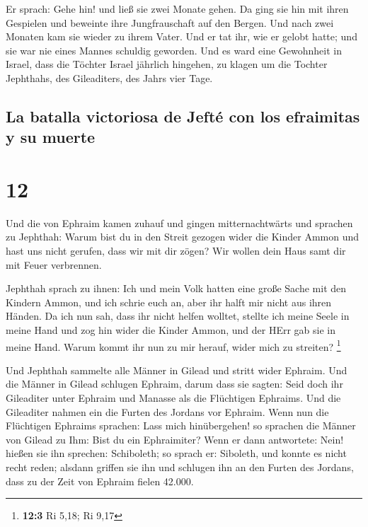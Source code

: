  Er sprach: Gehe hin! und ließ sie zwei Monate gehen. Da
ging sie hin mit ihren Gespielen und beweinte ihre Jungfrauschaft auf
den Bergen.  Und nach zwei Monaten kam sie wieder zu
ihrem Vater. Und er tat ihr, wie er gelobt hatte; und sie war nie eines
Mannes schuldig geworden. Und es ward eine Gewohnheit in Israel,
 dass die Töchter Israel jährlich hingehen, zu klagen um
die Tochter Jephthahs, des Gileaditers, des Jahrs vier Tage.

\hypertarget{la-batalla-victoriosa-de-jeftuxe9-con-los-efraimitas-y-su-muerte}{%
\subsection{La batalla victoriosa de Jefté con los efraimitas y su
muerte}\label{la-batalla-victoriosa-de-jeftuxe9-con-los-efraimitas-y-su-muerte}}

\hypertarget{section-11}{%
\section{12}\label{section-11}}

 Und die von Ephraim kamen zuhauf und gingen
mitternachtwärts und sprachen zu Jephthah: Warum bist du in den Streit
gezogen wider die Kinder Ammon und hast uns nicht gerufen, dass wir mit
dir zögen? Wir wollen dein Haus samt dir mit Feuer verbrennen.

 Jephthah sprach zu ihnen: Ich und mein Volk hatten eine
große Sache mit den Kindern Ammon, und ich schrie euch an, aber ihr
halft mir nicht aus ihren Händen.  Da ich nun sah, dass
ihr nicht helfen wolltet, stellte ich meine Seele in meine Hand und zog
hin wider die Kinder Ammon, und der HErr gab sie in meine Hand. Warum
kommt ihr nun zu mir herauf, wider mich zu streiten? \footnote{\textbf{12:3}
  Ri 5,18; Ri 9,17}

 Und Jephthah sammelte alle Männer in Gilead und stritt
wider Ephraim. Und die Männer in Gilead schlugen Ephraim, darum dass sie
sagten: Seid doch ihr Gileaditer unter Ephraim und Manasse als die
Flüchtigen Ephraims.  Und die Gileaditer nahmen ein die
Furten des Jordans vor Ephraim. Wenn nun die Flüchtigen Ephraims
sprachen: Lass mich hinübergehen! so sprachen die Männer von Gilead zu
Ihm: Bist du ein Ephraimiter? Wenn er dann antwortete: Nein!
 hießen sie ihn sprechen: Schiboleth; so sprach er:
Siboleth, und konnte es nicht recht reden; alsdann griffen sie ihn und
schlugen ihn an den Furten des Jordans, dass zu der Zeit von Ephraim
fielen 42.000.

